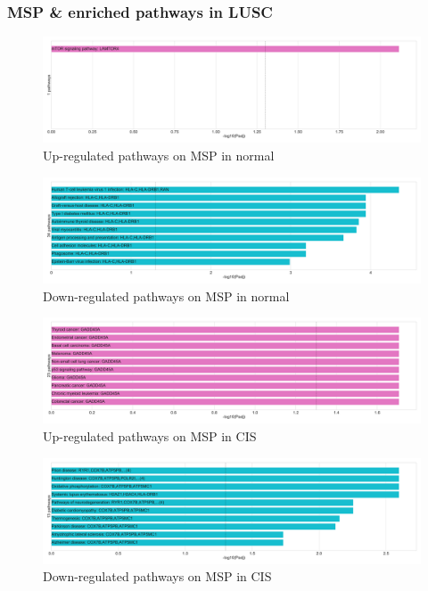 \documentclass{beamer}
\begin{document}
                \begin{frame}[allowframebreaks]
                    \frametitle{MSP \& enriched pathways in LUSC}

                    \begin{figure}
                        \includegraphics[width=0.6 \linewidth]{figures/DEG/Enrichment/STAR.TPM.SQC.Normal.MSP-Median.Up.KEGG.pdf}
                        \caption{Up-regulated pathways on MSP in normal}
                    \end{figure}

                    \begin{figure}
                        \includegraphics[width=0.6 \linewidth]{figures/DEG/Enrichment/STAR.TPM.SQC.Normal.MSP-Median.Down.KEGG.pdf}
                        \caption{Down-regulated pathways on MSP in normal}
                    \end{figure}

                    \begin{figure}
                        \includegraphics[width=0.6 \linewidth]{figures/DEG/Enrichment/STAR.TPM.SQC.CIS.MSP-Median.Up.KEGG.pdf}
                        \caption{Up-regulated pathways on MSP in CIS}
                    \end{figure}

                    \begin{figure}
                        \includegraphics[width=0.6 \linewidth]{figures/DEG/Enrichment/STAR.TPM.SQC.CIS.MSP-Median.Down.KEGG.pdf}
                        \caption{Down-regulated pathways on MSP in CIS}
                    \end{figure}


\end{frame}
\end{document}
